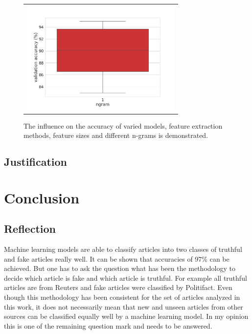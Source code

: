 \documentclass[a4paper,12pt,nottoc]{article}
\begin{document}
\begin{figure}[h]
\begin{center}
\begin{tabular}{c c}
\end{tabular}
\begin{tabular}{c}
\includegraphics[width=8cm]{output/ngram_performance.png} \\
\end{tabular}
\end{center}
\caption{The influence on the accuracy of varied models, feature extraction methods, feature sizes and different n-grams is demonstrated.}\label{fig:influenceparams}
\end{figure}

\subsection{Justification}



\section{Conclusion}

\subsection{Reflection}\label{chap:reflection}

Machine learning models are able to classify articles into two classes of truthful and fake articles really well. It can be shown that accuracies of 97\% can be achieved. But one has to ask the question what has been the methodology to decide which article is fake and which article is truthful. For example all truthful articles are from Reuters and fake articles were classified by Politifact. Even though this methodology has been consistent for the set of articles analyzed in this work, it does not necessarily mean that new and unseen articles from other sources can be classified equally well by a machine learning model. In my opinion this is one of the remaining question mark and needs to be answered.
\end{document}
